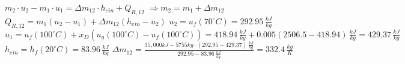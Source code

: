 \( m_2 \cdot u_2 - m_1 \cdot u_1 = \Delta m_{12} \cdot h_{ein} + Q_{R,12} \)  
\( \Rightarrow m_2 = m_1 + \Delta m_{12} \)  
\( Q_{R,12} = m_1 (u_2 - u_1) + \Delta m_{12} (h_{ein} - u_2) \)  
\( u_2 = u_f (70^\circ C) = 292.95 \, \frac{kJ}{kg} \)  
\( u_1 = u_f (100^\circ C) + x_D (u_g (100^\circ C) - u_f (100^\circ C)) = 418.94 \, \frac{kJ}{kg} + 0.005 (2506.5 - 418.94) \, \frac{kJ}{kg} = 429.37 \, \frac{kJ}{kg} \)  
\( h_{ein} = h_f (20^\circ C) = 83.96 \, \frac{kJ}{kg} \)  
\( \Delta m_{12} = \frac{35,000kJ - 5755kg \cdot (292.95 - 429.37) \, \frac{kJ}{kg}}{292.95 - 83.96 \, \frac{kJ}{kg}} = 332.4 \, \frac{kg}{K} \)